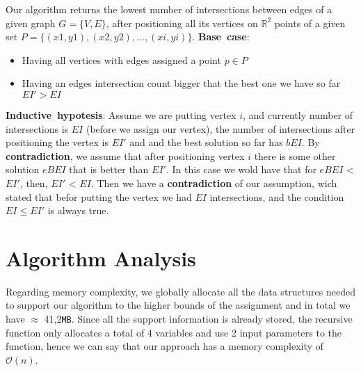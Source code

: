 \documentclass[12pt]{article}
\begin{document}
\qquad Our algorithm returns the lowest number of intersections between edges of a given graph $G=\{V,E\}$, after positioning all its vertices on $\mathbb{R}^2$ points of a given set $P=\{(x1,y1),(x2,y2),...,(xi,yi)\}$.\newline
\textbf{Base\ case}:
\begin{itemize}
    \itemsep0em
    \item Having all vertices with edges assigned a point $p \in P$
    \item Having an edges intersection count bigger that the best one we have so far $EI' > EI$
\end{itemize}
\textbf{Inductive\ hypotesis}: Assume we are putting vertex $i$, and currently number of intersections is $EI$ (before we assign our vertex), the number of intersections after positioning the vertex is $EI'$ and  and the best solution so far has $bEI$.
By \textbf{contradiction}, we assume that after positioning vertex $i$ there is some other solution $eBEI$ that is better than $EI'$. In this case we wold have that for $eBEI$ < $EI'$, then, $EI'$ < $EI$. Then we have a \textbf{contradiction} of our assumption, wich stated that befor putting the vertex we had $EI$ intersections, and the condition $EI \leq EI'$ is always true.

\section*{Algorithm Analysis}

\qquad Regarding memory complexity, we globally allocate all the data structures needed to support our algorithm to the higher bounds of the assignment and in total we have $\approx$ 41,2\verb|MB|. Since all the support information is already stored, the recursive function only allocates a total of 4 variables and use 2 input parameters to the function, hence we can say that our approach has a memory complexity of $\mathcal{O}(n)$.
\end{document}
